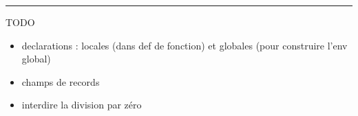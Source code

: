 \begin{center}\rule{3in}{0.4pt}\end{center}

TODO

\begin{itemize}
\item
  declarations : locales (dans def de fonction) et globales (pour construire
  l'env global)
\item
  champs de records
\item
  interdire la division par zéro
\end{itemize}
